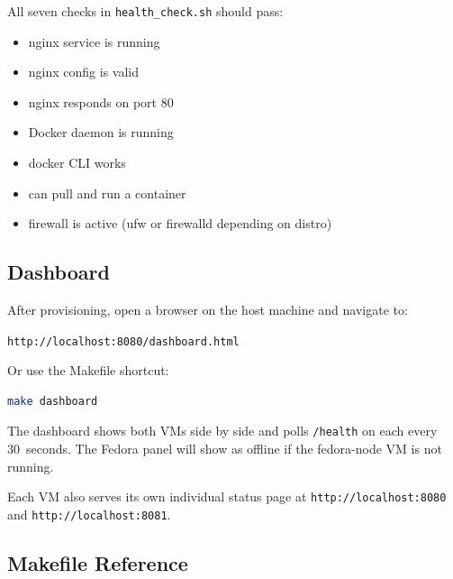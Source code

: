 \documentclass[11pt,a4paper]{article}
\begin{document}
All seven checks in \texttt{health\_check.sh} should pass:

\begin{itemize}
  \item nginx service is running
  \item nginx config is valid
  \item nginx responds on port 80
  \item Docker daemon is running
  \item docker CLI works
  \item can pull and run a container
  \item firewall is active (ufw or firewalld depending on distro)
\end{itemize}

\subsection{Dashboard}

After provisioning, open a browser on the host machine and navigate to:

\begin{center}
\texttt{http://localhost:8080/dashboard.html}
\end{center}

Or use the Makefile shortcut:

\begin{lstlisting}[language=bash]
make dashboard
\end{lstlisting}

The dashboard shows both VMs side by side and polls \texttt{/health} on each every 30~seconds. The Fedora panel will show as offline if the fedora-node VM is not running.

Each VM also serves its own individual status page at \texttt{http://localhost:8080} and \texttt{http://localhost:8081}.

\subsection{Makefile Reference}
\end{document}
